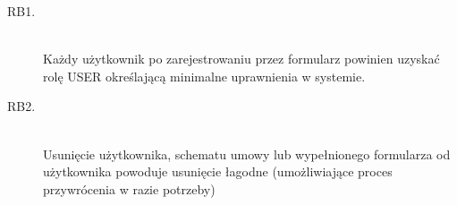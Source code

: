 \begin{description}
    \item[RB1.] \hfill \\
    Każdy użytkownik po zarejestrowaniu przez formularz powinien uzyskać rolę USER określającą minimalne uprawnienia w systemie. 
    
    \item[RB2.] \hfill \\
    Usunięcie użytkownika, schematu umowy lub wypełnionego formularza od użytkownika powoduje usunięcie łagodne (umożliwiające proces przywrócenia w razie potrzeby)  
\end{description}